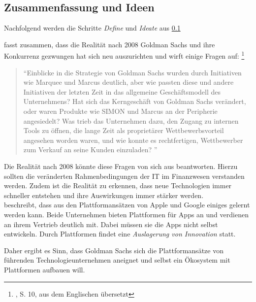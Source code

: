 \subsection{Zusammenfassung und Ideen}
Nachfolgend werden die Schritte \emph{Define} und \emph{Ideate} aus \ref{}

\citet{Gupta:2017} fasst zusammen, dass die Realität nach 2008 Goldman Sachs und ihre Konkurrenz gezwungen hat sich neu auszurichten und wirft einige Fragen auf: \footnote{\citet{Gupta:2017}, S. 10, aus dem Englischen übersetzt}
\begin{quote}
\enquote{Einblicke in die Strategie von Goldman Sachs wurden durch Initiativen wie Marquee und Marcus deutlich, aber wie passten diese und andere Initiativen der letzten Zeit in das allgemeine Geschäftsmodell des Unternehmens? Hat sich das Kerngeschäft von Goldman Sachs verändert, oder waren Produkte wie SIMON und Marcus an der Peripherie angesiedelt? Was trieb das Unternehmen dazu, den Zugang zu internen Tools zu öffnen, die lange Zeit als proprietärer Wettbewerbsvorteil angesehen worden waren, und wie konnte es rechtfertigen, Wettbewerber zum Verkauf an seine Kunden einzuladen?
    }
\end{quote}
Die Realität nach 2008 könnte diese Fragen von sich aus beantworten. Hierzu sollten die veränderten Rahmenbedingungen der IT im Finanzwesen verstanden werden. Zudem ist die Realität zu erkennen, dass neue Technologien immer schneller entstehen und ihre Auswirkungen immer stärker werden. 
\medskip
\\
\citet{Eismann2015} beschreibt, dass aus den Plattformansätzen von Apple und Google einiges gelernt werden kann. Beide Unternehmen bieten Plattformen für Apps an und verdienen an ihrem Vertrieb deutlich mit. Dabei müssen sie die Apps nicht selbst entwickeln. Durch Plattformen findet eine \emph{Auslagerung von Innovation \cite{Eismann2015}} statt.

Daher ergibt es Sinn, dass Goldman Sachs sich die Plattformansätze von führenden Technologieunternehmen aneignet und selbst ein Ökosystem mit Plattformen aufbauen will. 

